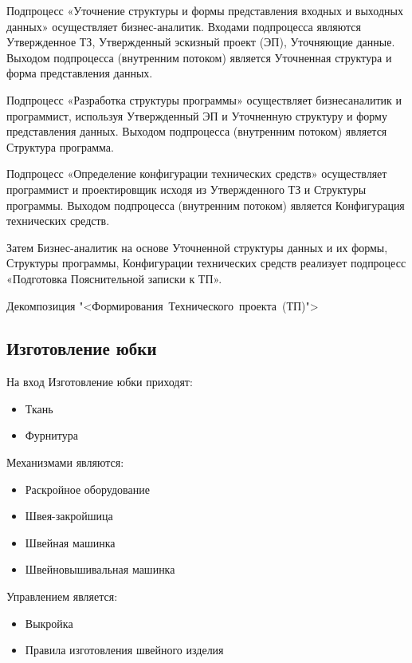 Подпроцесс «Уточнение структуры и формы представления входных и
выходных данных» осуществляет бизнес-аналитик.
Входами подпроцесса  являются Утвержденное ТЗ,
Утвержденный эскизный проект (ЭП), Уточняющие данные.
Выходом подпроцесса (внутренним потоком) является
Уточненная структура и форма представления данных.\par
Подпроцесс «Разработка структуры программы» осуществляет бизнесаналитик
и программист, используя
Утвержденный ЭП и Уточненную структуру и форму представления данных.
Выходом подпроцесса (внутренним потоком) является Структура программа.\par
Подпроцесс «Определение конфигурации технических средств»
осуществляет программист и проектировщик исходя из Утвержденного ТЗ и
Структуры программы.
Выходом подпроцесса (внутренним потоком) является
Конфигурация технических средств.\par
Затем Бизнес-аналитик на основе Уточненной структуры данных и их
формы, Структуры программы, Конфигурации технических средств реализует
подпроцесс «Подготовка Пояснительной записки к ТП».

\begin{image}
	\caption{Декомпозиция "<Формирования~Технического~проекта~(ТП)">}
	\label{fig:IDEF0:a1}
\end{image}

\subsection{Изготовление юбки}

На вход Изготовление юбки приходят:
\begin{itemize}
	\item Ткань
	\item Фурнитура
\end{itemize}

Механизмами являются:
\begin{itemize}
	\item Раскройное оборудование
	\item Швея-закройшица
	\item Швейная машинка
	\item Швейновышивальная машинка
\end{itemize}

Управлением является:
\begin{itemize}
	\item Выкройка
	\item Правила изготовления швейного изделия
\end{itemize}

